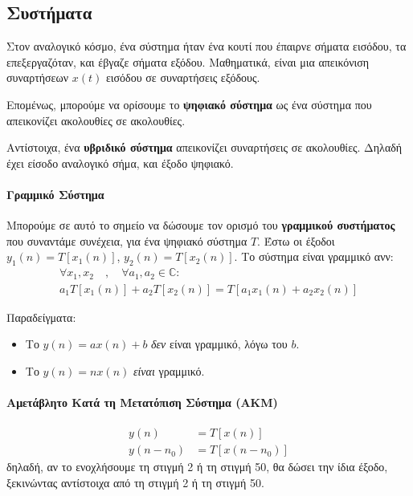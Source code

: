 \documentclass[11pt,a4paper,notitlepage,fleqn,draft]{article}
\begin{document}
\subsection{Συστήματα}
Στον αναλογικό κόσμο, ένα σύστημα ήταν ένα κουτί που έπαιρνε σήματα εισόδου, τα επεξεργαζόταν, και έβγαζε σήματα εξόδου. Μαθηματικά, είναι μια απεικόνιση συναρτήσεων \( x(t) \) εισόδου σε συναρτήσεις εξόδους.

Επομένως, μπορούμε να ορίσουμε το \textbf{ψηφιακό σύστημα} ως ένα σύστημα που απεικονίζει ακολουθίες
σε ακολουθίες.


Αντίστοιχα, ένα \textbf{υβριδικό σύστημα} απεικονίζει συναρτήσεις σε ακολουθίες. Δηλαδή έχει είσοδο αναλογικό σήμα, και έξοδο ψηφιακό.

\paragraph{Γραμμικό Σύστημα}
Μπορούμε σε αυτό το σημείο να δώσουμε τον ορισμό του \textbf{γραμμικού συστήματος} που συναντάμε συνέχεια,
για ένα ψηφιακό σύστημα \( T \). Έστω οι έξοδοι \( y_1(n) = T\left[x_1(n)\right] \),
\( y_2(n) = T\left[x_2(n)\right] \). Το σύστημα είναι γραμμικό ανν:
\begin{gather*}
\forall x_1,x_2\quad,\quad \forall a_1,a_2\in\mathbb C:\\
a_1T\left[x_1(n)\right]+a_2T\left[x_2(n)\right] = T\left[a_1x_1(n)+a_2x_2(n)\right]
\end{gather*}

Παραδείγματα:
\begin{itemize}
	\item Το \( y(n) = ax(n) + b \) \textit{δεν} είναι γραμμικό, λόγω του \( b \).
	\item Το \( y(n) = nx(n) \) \textit{είναι} γραμμικό.
\end{itemize}

\paragraph{Αμετάβλητο Κατά τη Μετατόπιση Σύστημα (ΑΚΜ)}
\begin{align*}
	y(n) &= T\left[x(n)\right] \\
	y(n-n_0) &= T\left[x(n-n_0)\right]
\end{align*}
δηλαδή, αν το ενοχλήσουμε τη στιγμή 2 ή τη στιγμή 50, θα δώσει την ίδια έξοδο, ξεκινώντας αντίστοιχα
από τη στιγμή 2 ή τη στιγμή 50.
\end{document}
